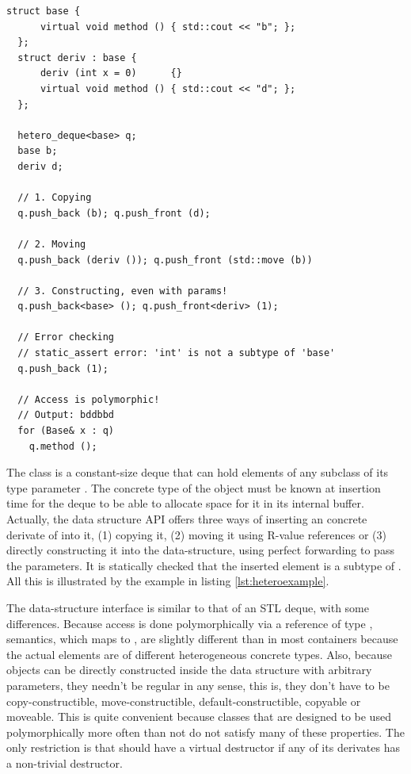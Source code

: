 \begin{lstlisting}[float=h!,caption=Example of usage of heterogeneous deques,label=lst:heteroexample]
  struct base {
      virtual void method () { std::cout << "b"; };
  };
  struct deriv : base { 
      deriv (int x = 0)      {} 
      virtual void method () { std::cout << "d"; };
  };

  hetero_deque<base> q;
  base b;
  deriv d;

  // 1. Copying
  q.push_back (b); q.push_front (d);

  // 2. Moving
  q.push_back (deriv ()); q.push_front (std::move (b))

  // 3. Constructing, even with params!
  q.push_back<base> (); q.push_front<deriv> (1);

  // Error checking
  // static_assert error: 'int' is not a subtype of 'base'
  q.push_back (1); 

  // Access is polymorphic!
  // Output: bddbbd
  for (Base& x : q)
    q.method ();
\end{lstlisting}

The class  is a
cons\-tant-size deque that can hold elements of any subclass of its type
parameter . The concrete type of the object must be known
at insertion time for the deque to be able to allocate space for it in
its internal buffer. Actually, the data structure API offers three
ways of inserting an concrete derivate of  into it, (1)
copying it, (2) moving it using R-value references or (3) directly
constructing it into the data-structure, using perfect forwarding to
pass the parameters. It is statically checked that the inserted
element is a subtype of . All this is illustrated by the
example in listing \ref{lst:heteroexample}.

The data-structure interface is similar to that of an STL deque, with
some differences. Because access is done polymorphically via a
reference of type ,  semantics, which
maps to , are slightly different than in most containers
because the actual elements are of different heterogeneous concrete
types. Also, because objects can be directly constructed inside the
data structure with arbitrary parameters, they needn't be regular in
any sense, this is, they don't have to be copy-constructible,
move-constructible, default-constructible, copyable or moveable. This
is quite convenient because classes that are designed to be used
polymorphically more often than not do not satisfy many of these
properties. The only restriction is that  should have a
virtual destructor if any of its derivates has a non-trivial
destructor.

